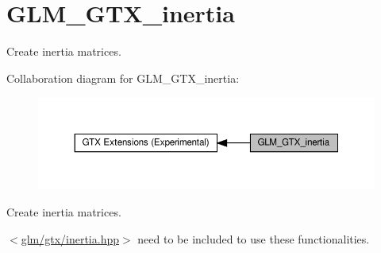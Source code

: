 \hypertarget{group__gtx__inertia}{}\section{G\+L\+M\+\_\+\+G\+T\+X\+\_\+inertia}
\label{group__gtx__inertia}


Create inertia matrices.  


Collaboration diagram for G\+L\+M\+\_\+\+G\+T\+X\+\_\+inertia\+:\nopagebreak
\begin{figure}[H]
\begin{center}
\leavevmode
\includegraphics[width=350pt]{group__gtx__inertia}
\end{center}
\end{figure}
Create inertia matrices. 

$<$\hyperlink{inertia_8hpp}{glm/gtx/inertia.\+hpp}$>$ need to be included to use these functionalities. 